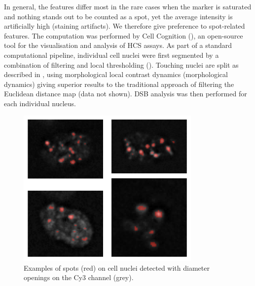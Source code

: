 In general, the features differ most in the rare cases when the marker is saturated and nothing stands out to be counted as a spot, yet the average intensity is artificially high (staining artifacts). We therefore give preference to spot-related features. The computation was performed by Cell Cognition (\cite{held2010cellcognition}), an open-source tool for the visualisation and analysis of HCS assays. As part of a standard computational pipeline, individual cell nuclei were first segmented by a combination of filtering and local thresholding (\cite{held2010cellcognition}). Touching nuclei are split as described in \cite{Naylor2017}, using morphological local contrast dynamics (morphological dynamics) giving superior results to the traditional approach of filtering the Euclidean distance map (data not shown). DSB analysis was then performed for each individual nucleus.

\begin{figure}[b!]
\centering
\includegraphics[width=0.8\textwidth]{img/spots.png}
\caption{Examples of spots (red) on cell nuclei detected with diameter openings on the Cy3 channel (grey).}
\label{fig:spots}
\end{figure}


